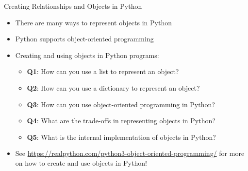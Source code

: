 \documentclass[14pt,aspectratio=169]{beamer}
\begin{document}
%
\begin{frame}{Creating Relationships and Objects in Python}
  \begin{itemize}
    \item There are many ways to represent objects in Python
      \vspace*{-.2in}
    \item Python supports object-oriented programming
      \vspace*{-.2in}
    \item Creating and using objects in Python programs:
      \begin{itemize}
        \item {\bf Q1}: How can you use a list to represent an object?
        \item {\bf Q2}: How can you use a dictionary to represent an object?
        \item {\bf Q3}: How can you use object-oriented programming in Python?
        \item {\bf Q4}: What are the trade-offs in representing objects in
          Python?
        \item {\bf Q5}: What is the internal implementation of objects in
          Python?
      \end{itemize}
      \vspace*{-.2in}
    \item See \url{https://realpython.com/python3-object-oriented-programming/}
      for more on how to create and use objects in Python!
  \end{itemize}
\end{frame}
\end{document}
